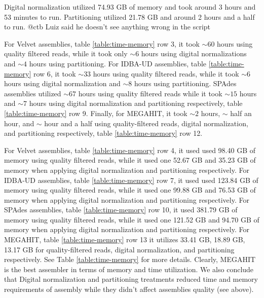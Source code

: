 Digital normalization utilized 74.93 GB of memory and took around 3
hours and 53 minutes to run. Partitioning utilized 21.78 GB and around
2 hours and a half to run. @ctb Luiz said he doesn't see anything wrong in the script

For Velvet assemblies, table \ref{table:time-memory} row 3, it took $\sim 60$ hours using quality filtered reads, while it took only $\sim 6$ hours using digital normalizations
and $\sim 4$ hours using partitioning.  For IDBA-UD assemblies, table \ref{table:time-memory} row 6, it took $\sim 33$ hours using quality filtered reads, while it took $\sim 6$
hours using digital normalization and $\sim 8$ hours using
partitioning.  SPAdes assemblies utilized $\sim 67$ hours using quality
filtered reads while it took $\sim15$ hours and $\sim 7$ hours using
digital normalization and partitioning respectively, table \ref{table:time-memory} row 9. Finally, for
MEGAHIT, it took $\sim 2$ hours, $\sim$ half an hour, and $\sim$ hour
and a half using quality-filtered reads, digital normalization, and
partitioning respectively, table \ref{table:time-memory} row 12.
 
For Velvet assemblies, table \ref{table:time-memory} row 4, it used used 98.40 GB of memory using quality
filtered reads, while it used one 52.67 GB and 35.23 GB of memory when
applying digital normalization and partitioning respectively. For IDBA-UD
assemblies, table \ref{table:time-memory} row 7, it used used 123.84 GB of memory using quality filtered
reads, while it used one 99.88 GB and 76.53 GB of memory when applying
digital normalization and partitioning respectively. For SPAdes
assemblies, table \ref{table:time-memory} row 10, it used 381.79 GB of memory using quality filtered reads,
while it used one 121.52 GB and 94.70 GB of memory when applying
digital normalization and partitioning respectively.  For MEGAHIT, table \ref{table:time-memory} row 13 it
utilizes 33.41 GB, 18.89 GB, 13.17 GB for quality-filtered reads,
digital normalization, and partitioning respectively. See Table
\ref{table:time-memory} for more details. Clearly, MEGAHIT is the
best assembler in terms of memory and time utilization. We also
conclude that Digital normalization and partitioning treatments
reduced time and memory requirements of assembly while they didn't
affect assemblies quality (see above).

 
